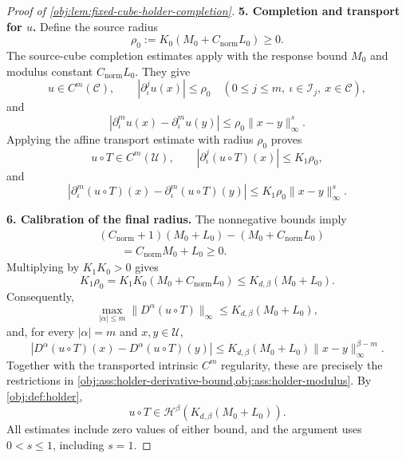 \documentclass[11pt]{article}
\begin{document}
\begin{proof}[Proof of \cref{obj:lem:fixed-cube-holder-completion}]
\textbf{5. Completion and transport for \(u\).}
Define the source radius
\[
\rho_0:=K_0(M_0+C_{\mathrm{norm}}L_0)\ge0.
\]
The source-cube completion estimates apply with the response bound \(M_0\) and modulus constant \(C_{\mathrm{norm}}L_0\). They give
\[
u\in C^m(\mathscr C),\qquad
|\partial_\iota^j u(x)|\le\rho_0
\quad(0\le j\le m,\ \iota\in\mathscr I_j,\ x\in\mathscr C),
\]
and
\[
|\partial_\iota^m u(x)-\partial_\iota^m u(y)|
\le\rho_0\|x-y\|_\infty^s.
\]
Applying the affine transport estimate with radius \(\rho_0\) proves
\[
u\circ T\in C^m(\mathscr U),\qquad
|\partial_\iota^j(u\circ T)(x)|\le K_1\rho_0,
\]
and
\[
|\partial_\iota^m(u\circ T)(x)
-\partial_\iota^m(u\circ T)(y)|
\le K_1\rho_0\|x-y\|_\infty^s.
\]

\textbf{6. Calibration of the final radius.}
The nonnegative bounds imply
\[
\begin{aligned}
&(C_{\mathrm{norm}}+1)(M_0+L_0)
-(M_0+C_{\mathrm{norm}}L_0)\\
&\qquad=C_{\mathrm{norm}}M_0+L_0\ge0.
\end{aligned}
\]
Multiplying by \(K_1K_0>0\) gives
\[
K_1\rho_0
=
K_1K_0(M_0+C_{\mathrm{norm}}L_0)
\le K_{d,\beta}(M_0+L_0).
\]
Consequently,
\[
\max_{|\alpha|\le m}
\|D^\alpha(u\circ T)\|_\infty
\le K_{d,\beta}(M_0+L_0),
\]
and, for every \(|\alpha|=m\) and \(x,y\in\mathscr U\),
\[
|D^\alpha(u\circ T)(x)-D^\alpha(u\circ T)(y)|
\le
K_{d,\beta}(M_0+L_0)\|x-y\|_\infty^{\beta-m}.
\]
Together with the transported intrinsic \(C^m\) regularity, these are precisely the restrictions in
\cref{obj:ass:holder-derivative-bound,obj:ass:holder-modulus}.
By \cref{obj:def:holder},
\[
u\circ T\in
\mathcal H^\beta\!\left(K_{d,\beta}(M_0+L_0)\right).
\]
All estimates include zero values of either bound, and the argument uses \(0<s\le1\), including \(s=1\).
\end{proof}
\end{document}
